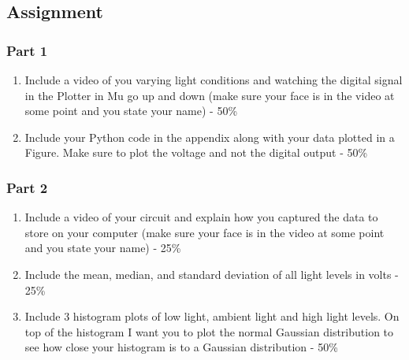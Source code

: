 \subsection{Assignment}


        
\subsubsection{Part 1}
\begin{enumerate}[itemsep=-5pt]
\item Include a video of you varying light conditions and watching the digital signal in the Plotter in Mu go up and down (make sure your face is in the video at some point and you state your name) - 50\%
\item Include your Python code in the appendix along with your data plotted in a Figure. Make sure to plot the voltage and not the digital output - 50\%
\end{enumerate}

\subsubsection{Part 2}
\begin{enumerate}[itemsep=-5pt]
\item Include a video of your circuit and explain how you captured the data to store on your computer (make sure your face is in the video at some point and you state your name) - 25\%
\item Include the mean, median, and standard deviation of all light levels in volts - 25\%
\item Include 3 histogram plots of low light, ambient light and high light levels. On top of the histogram I want you to plot the normal Gaussian distribution to see how close your histogram is to a Gaussian distribution  - 50\%
\end{enumerate}
